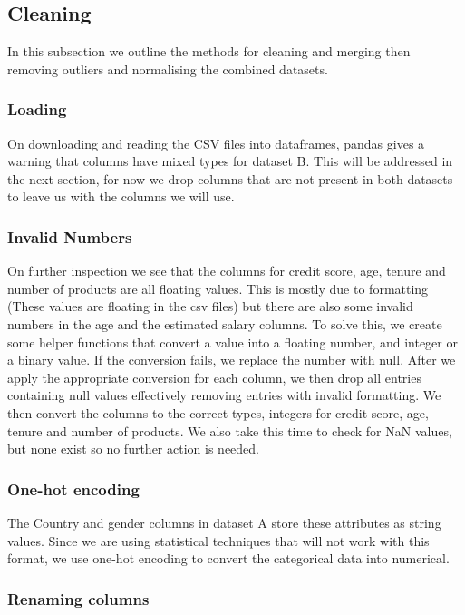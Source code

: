 \documentclass[]{article}
\begin{document}
\subsection{Cleaning}

In this subsection we outline the methods for cleaning and merging then removing outliers and normalising the combined datasets.

\subsubsection{Loading}

On downloading and reading the CSV files into dataframes, pandas gives a warning that columns have mixed types for dataset B. This will be addressed in the next section, for now we drop columns that are not present in both datasets to leave us with the columns we will use.

\subsubsection{Invalid Numbers}

On further inspection we see that the columns for credit score, age, tenure and number of products are all floating values. This is mostly due to formatting (These values are floating in the csv files) but there are also some invalid numbers in the age and the estimated salary columns. To solve this, we create some helper functions that convert a value into a floating number, and integer or a binary value. If the conversion fails, we replace the number with null. After we apply the appropriate conversion for each column, we then drop all entries containing null values effectively removing entries with invalid formatting. We then convert the columns to the correct types, integers for credit score, age, tenure and number of products. We also take this time to check for NaN values, but none exist so no further action is needed.

\subsubsection{One-hot encoding}

The Country and gender columns in dataset A store these attributes as string values. Since we are using statistical techniques that will not work with this format, we use one-hot encoding to convert the categorical data into numerical.

\subsubsection{Renaming columns}
\end{document}

